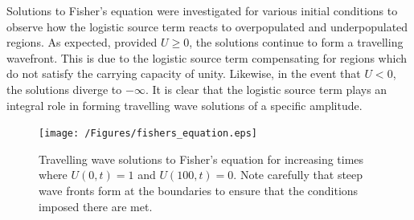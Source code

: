 \documentclass[11pt,titlepage,a4paper]{article}
\begin{document}
		Solutions to Fisher's equation were investigated for various initial conditions to observe how the logistic source term reacts to overpopulated and underpopulated regions. As expected, provided $U \ge 0$, the solutions continue to form a travelling wavefront. This is due to the logistic source term compensating for regions which do not satisfy the carrying capacity of unity. Likewise, in the event that $U < 0$, the solutions diverge to $-\infty$. It is clear that the logistic source term plays an integral role in forming travelling wave solutions of a specific amplitude.

		\begin{figure}[tbh]
			\centering
				\texttt{[image: /Figures/fishers\_equation.eps]}
			\caption{Travelling wave solutions to Fisher's equation for increasing times where $U(0, t) = 1$ and $U(100, t) = 0$. Note carefully that steep wave fronts form at the boundaries to ensure that the conditions imposed there are met.}
			\label{fig:fishers_equation_sol_pdepe}
		\end{figure}
	



\clearpage
\printbibliography

\end{document}

